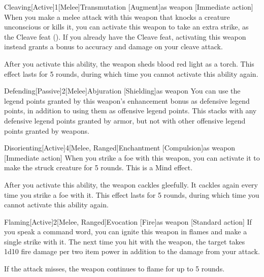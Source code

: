        \begin{magicitemdef}{Cleaving}[Active]{1}[Melee]{Transmutation [Augment]}{as weapon}
            [Immediate action] When you make a melee attack with this weapon that knocks a creature unconscious or kills it, you can activate this weapon to take an extra strike, as the Cleave feat ().
            If you already have the Cleave feat, activating this weapon instead grants a  bonus to accuracy and damage on your cleave attack.

            After you activate this ability, the weapon sheds blood red light as a torch.
            This effect lasts for 5 rounds, during which time you cannot activate this ability again.
        \end{magicitemdef}

        \begin{magicitemdef}{Defending}[Passive]{2}[Melee]{Abjuration [Shielding]}{as weapon}
             You can use the legend points granted by this weapon's enhancement bonus as defensive legend points, in addition to using them as offensive legend points.
            This stacks with any defensive legend points granted by armor, but not with other offensive legend points granted by weapons.
        \end{magicitemdef}

        \begin{magicitemdef}{Disorienting}[Active]{4}[Melee, Ranged]{Enchantment [Compulsion]}{as weapon}
            [Immediate action] When you strike a foe with this weapon, you can activate it to make the struck creature \disoriented for 5 rounds.
            This is a Mind effect.

            After you activate this ability, the weapon cackles gleefully.
            It cackles again every time you strike a foe with it.
            This effect lasts for 5 rounds, during which time you cannot activate this ability again.
        \end{magicitemdef}

        \begin{magicitemdef}{Flaming}[Active]{2}[Melee, Ranged]{Evocation [Fire]}{as weapon}
            [Standard action] If you speak a command word, you can ignite this weapon in flames and make a single strike with it. The next time you hit with the weapon, the target takes 1d10 fire damage per two item power in addition to the damage from your attack.

            If the attack misses, the weapon continues to flame for up to 5 rounds.
        \end{magicitemdef}

